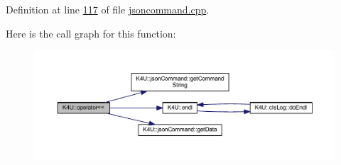 Definition at line \hyperlink{jsoncommand_8cpp_source_l00117}{117} of file \hyperlink{jsoncommand_8cpp_source}{jsoncommand.\-cpp}.



Here is the call graph for this function\-:\nopagebreak
\begin{figure}[H]
\begin{center}
\leavevmode
\includegraphics[width=350pt]{d6/d75/namespace_k4_u_a0c716ceb468c5d67c805ba246f06c79d_cgraph}
\end{center}
\end{figure}


